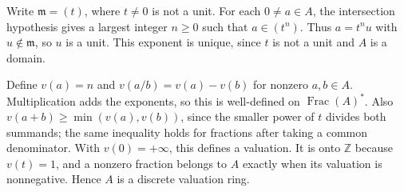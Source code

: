 Write $\mathfrak m=(t)$, where $t\ne0$ is not a unit. For each $0\ne a\in A$, the intersection hypothesis gives a largest integer $n\geq0$ such that $a\in(t^n)$. Thus $a=t^nu$ with $u\notin\mathfrak m$, so $u$ is a unit. This exponent is unique, since $t$ is not a unit and $A$ is a domain.

Define $v(a)=n$ and $v(a/b)=v(a)-v(b)$ for nonzero $a,b\in A$. Multiplication adds the exponents, so this is well-defined on $\operatorname{Frac}(A)^*$. Also $v(a+b)\geq\min(v(a),v(b))$, since the smaller power of $t$ divides both summands; the same inequality holds for fractions after taking a common denominator. With $v(0)=+\infty$, this defines a valuation. It is onto $\mathbb Z$ because $v(t)=1$, and a nonzero fraction belongs to $A$ exactly when its valuation is nonnegative. Hence $A$ is a discrete valuation ring.

